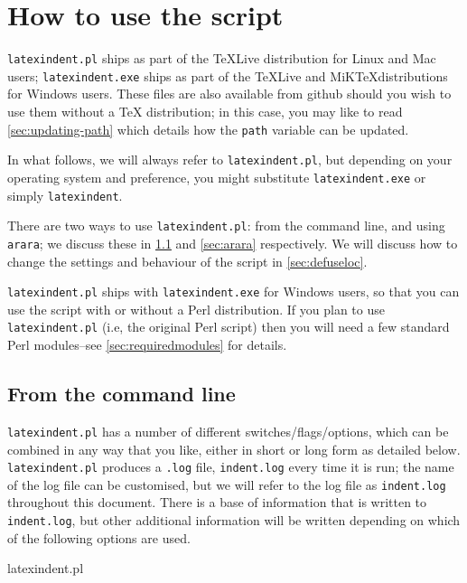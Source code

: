 \section{How to use the script}
\texttt{latexindent.pl} ships as part of the \TeX Live distribution for
Linux and Mac users; \texttt{latexindent.exe} ships as part of the \TeX Live
and MiK\TeX distributions for Windows users. These files are also available
from github \cite{latexindent-home} should you wish to use them without
a \TeX{} distribution; in this case, you may like to read \vref{sec:updating-path}
which details how the \texttt{path} variable can be updated.

In what follows, we will always refer to \texttt{latexindent.pl}, but depending on
your operating system and preference, you might substitute \texttt{latexindent.exe} or
simply \texttt{latexindent}.

There are two ways to use \texttt{latexindent.pl}: from the command line,
and using \texttt{arara}; we discuss these in \cref{sec:commandline} and
\cref{sec:arara} respectively. We will discuss how to change the settings and
behaviour of the script in \vref{sec:defuseloc}.

\texttt{latexindent.pl} ships with \texttt{latexindent.exe} for Windows
users, so that you can use the script with or without a Perl distribution.
If you plan to use \texttt{latexindent.pl} (i.e, the original Perl script) then you will
need a few standard Perl modules--see \vref{sec:requiredmodules} for details.

\subsection{From the command line}\label{sec:commandline}
\texttt{latexindent.pl} has a number of different switches/flags/options, which
can be combined in any way that you like, either in short or long form as detailed below.
\texttt{latexindent.pl}  produces a \texttt{.log} file, \texttt{indent.log} every time it
is run; the name of the log file can be customised, but we will
refer to the log file as \texttt{indent.log} throughout this document.
There is a base of information that is written to \texttt{indent.log},
but other additional information will be written depending
on which of the following options are used.

\begin{commandshell}
latexindent.pl
      \end{commandshell}

